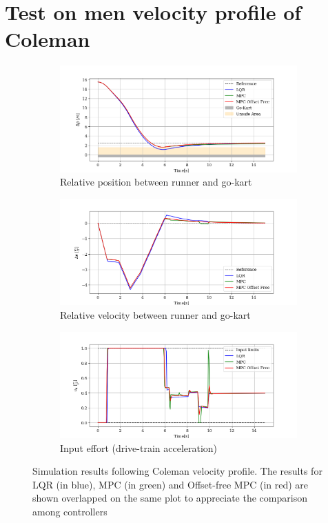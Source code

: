 \documentclass[a4paper,12pt,oneside]{book}
\begin{document}
\section{Test on men velocity profile of Coleman}
\begin{figure}[h!]
    \centering
    \begin{subfigure}[t]{0.8\textwidth}
        \includegraphics[width=\textwidth]{Coleman/Deltap.png}
        \caption{Relative position between runner and go-kart}
        \label{fig:Deltapmen}
    \end{subfigure}
    
    \begin{subfigure}[t]{0.8\textwidth}
        \includegraphics[width=\textwidth]{Coleman/Deltav.png}
        \caption{Relative velocity between runner and go-kart}
        \label{fig:Deltaven}
    \end{subfigure}
    
    \begin{subfigure}[t]{0.8\textwidth}
        \includegraphics[width=\textwidth]{Coleman/Input.png}
        \caption{Input effort (drive-train acceleration)}
        \label{fig:Inputmen}
    \end{subfigure}
    \caption{Simulation results following Coleman velocity profile. The results for LQR (in blue), MPC (in green) and Offset-free MPC (in red) are shown overlapped on the same plot to appreciate the comparison among controllers}
    \label{fig:Men}
\end{figure}
\end{document}
